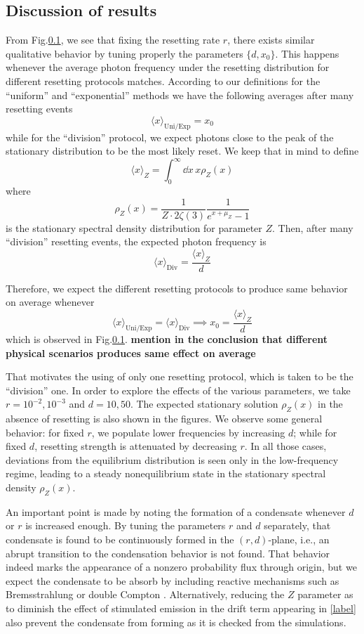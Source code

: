 \documentclass[a4paper,12pt,reqno,superscriptaddress,nofootinbib]{article}
\theoremstyle{plain}
\theoremstyle{definition}
\theoremstyle{remark}
\newcommand{\0}{^{(0)}}
\newcommand{\1}{^{(1)}}
\newcommand{\2}{^{(2)}}
\begin{document}
\subsection{Discussion of results}

From Fig.\ref{}, we see that fixing the resetting rate $r$, there exists similar qualitative behavior by tuning properly the parameters $\{d,x_0\}$. This happens whenever the average photon frequency under the resetting distribution for different resetting protocols matches. According to our definitions for the ``uniform'' and ``exponential'' methods we have the following averages after many resetting events
\[\langle x \rangle_{\text{Uni/Exp}} = x_0\]
while for the ``division'' protocol, we expect photons close to the peak of the stationary distribution to be the most likely reset. We keep that in mind to define
\[\langle x \rangle_Z = \int_0^{\infty}\dd x\,  x\rho_Z(x)\]
where 
\[\rho_Z(x) = \frac{1}{Z\cdot2\zeta(3)}\frac{1}{e^{x+\mu_Z}-1}\]
is the stationary spectral density distribution for parameter $Z$. Then, after many ``division'' resetting events, the expected photon frequency is
\[\langle x\rangle_{\text{Div}}=\frac{\langle x \rangle_Z}{d} \]

Therefore, we expect the different resetting protocols to produce same behavior on average whenever
\[\langle x \rangle_{\text{Uni/Exp}}=\langle x\rangle_{\text{Div}} \implies x_0=\frac{\langle x \rangle_Z}{d}\]
which is observed in Fig.\ref{}. \textbf{mention in the conclusion that different physical scenarios produces same effect on average}

That motivates the using of only one resetting protocol, which is taken to be the ``division'' one. In order to explore the effects of the various parameters, we take $r=10^{-2},10^{-3}$ and $d=10,50$. The expected stationary solution $\rho_Z(x)$ in the absence of resetting is also shown in the figures. We observe some general behavior: for fixed $r$, we populate lower frequencies by increasing $d$; while for fixed $d$, resetting strength is attenuated by decreasing $r$. In all those cases, deviations from the equilibrium distribution is seen only in the low-frequency regime, leading to a steady nonequilibrium state in the stationary spectral density $\rho_Z(x)$.

An important point is made by noting the formation of a condensate whenever $d$ or $r$ is increased enough. By tuning the parameters $r$ and $d$ separately, that condensate is found to be continuously formed in the $(r,d)$-plane, i.e., an abrupt transition to the condensation behavior is not found. That behavior indeed marks the appearance of a nonzero probability flux through origin, but we expect the condensate to be absorb by including reactive mechanisms such as Bremsstrahlung or double Compton \cite{paper2}. Alternatively, reducing the $Z$ parameter as to diminish the effect of stimulated emission in the drift term appearing in \eqref{label} also prevent the condensate from forming as it is checked from the simulations.
\end{document}
